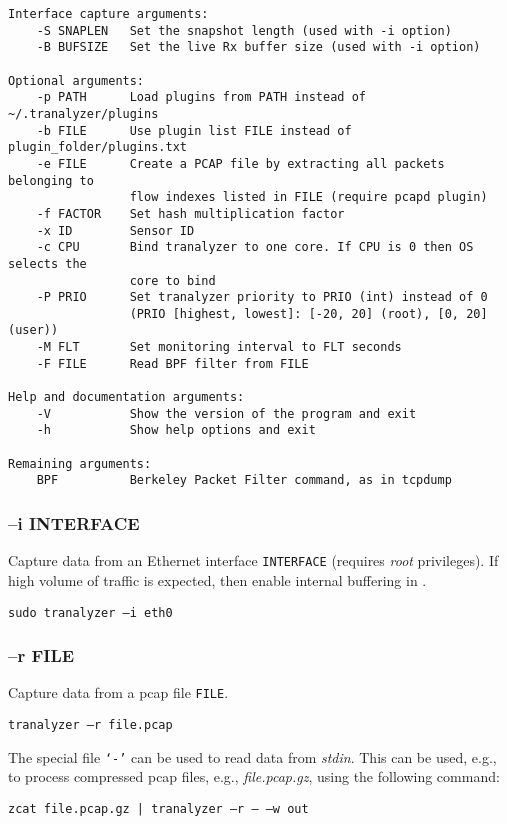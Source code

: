 \begin{verbatim}
Interface capture arguments:
    -S SNAPLEN   Set the snapshot length (used with -i option)
    -B BUFSIZE   Set the live Rx buffer size (used with -i option)

Optional arguments:
    -p PATH      Load plugins from PATH instead of ~/.tranalyzer/plugins
    -b FILE      Use plugin list FILE instead of plugin_folder/plugins.txt
    -e FILE      Create a PCAP file by extracting all packets belonging to
                 flow indexes listed in FILE (require pcapd plugin)
    -f FACTOR    Set hash multiplication factor
    -x ID        Sensor ID
    -c CPU       Bind tranalyzer to one core. If CPU is 0 then OS selects the
                 core to bind
    -P PRIO      Set tranalyzer priority to PRIO (int) instead of 0
                 (PRIO [highest, lowest]: [-20, 20] (root), [0, 20] (user))
    -M FLT       Set monitoring interval to FLT seconds
    -F FILE      Read BPF filter from FILE

Help and documentation arguments:
    -V           Show the version of the program and exit
    -h           Show help options and exit

Remaining arguments:
    BPF          Berkeley Packet Filter command, as in tcpdump
\end{verbatim}

\subsubsection{--i INTERFACE}
Capture data from an Ethernet interface {\tt INTERFACE} (requires {\em root} privileges).
If high volume of traffic is expected, then enable internal buffering in .

\begin{center}
    {\tt sudo tranalyzer --i eth0}
\end{center}

\subsubsection{--r FILE}
Capture data from a pcap file {\tt FILE}.
\begin{center}
    {\tt tranalyzer --r file.pcap}
\end{center}

The special file {\tt `-'} can be used to read data from {\em stdin}. This can be used, e.g., to process compressed pcap files, e.g., {\em file.pcap.gz}, using the following command:
\begin{center}
    {\tt zcat file.pcap.gz | tranalyzer --r -- --w out}
\end{center}

